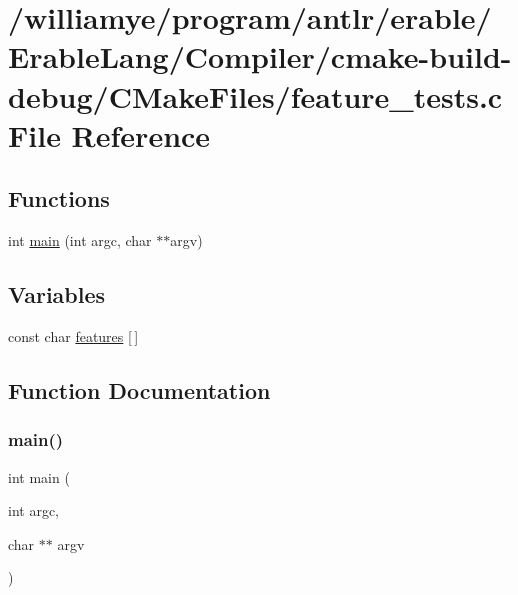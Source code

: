 \hypertarget{_compiler_2cmake-build-debug_2_c_make_files_2feature__tests_8c}{}\section{/williamye/program/antlr/erable/\+Erable\+Lang/\+Compiler/cmake-\/build-\/debug/\+C\+Make\+Files/feature\+\_\+tests.c File Reference}
\label{_compiler_2cmake-build-debug_2_c_make_files_2feature__tests_8c}
\subsection*{Functions}
\begin{DoxyCompactItemize}
\item 
int \mbox{\hyperlink{_compiler_2cmake-build-debug_2_c_make_files_2feature__tests_8c_a3c04138a5bfe5d72780bb7e82a18e627}{main}} (int argc, char $\ast$$\ast$argv)
\end{DoxyCompactItemize}
\subsection*{Variables}
\begin{DoxyCompactItemize}
\item 
const char \mbox{\hyperlink{_compiler_2cmake-build-debug_2_c_make_files_2feature__tests_8c_a1582568e32f689337602a16bf8a5bff0}{features}} \mbox{[}$\,$\mbox{]}
\end{DoxyCompactItemize}


\subsection{Function Documentation}
\mbox{\label{_compiler_2cmake-build-debug_2_c_make_files_2feature__tests_8c_a3c04138a5bfe5d72780bb7e82a18e627}} 
\subsubsection{\texorpdfstring{main()}{main()}}
{\footnotesize\ttfamily int main (\begin{DoxyParamCaption}\item[{int}]{argc,  }\item[{char $\ast$$\ast$}]{argv }\end{DoxyParamCaption})}




